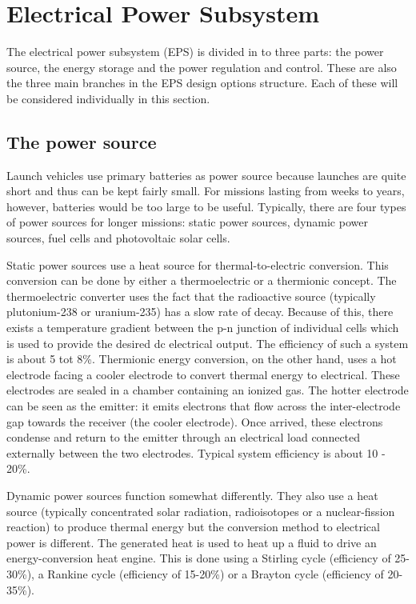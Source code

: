 \section{Electrical Power Subsystem}
\label{blDOEPS}

The electrical power subsystem (EPS) is divided in to three parts: the power source, the energy storage and the power regulation and control.
These are also the three main branches in the EPS design options structure. Each of these will be considered individually in this section.

\subsection{The power source}
\label{blDOPS}

Launch vehicles use primary batteries as power source because launches are quite short and thus can be kept fairly small. 
For missions lasting from weeks to years, however, batteries would be too large to be useful.
Typically, there are four types of power sources for longer missions: static power sources, dynamic power sources, fuel cells and photovoltaic solar cells.

Static power sources use a heat source for thermal-to-electric conversion. This conversion can be done by either a thermoelectric or a thermionic
concept. The thermoelectric converter uses the fact that the radioactive source (typically plutonium-238 or uranium-235) has a slow rate of decay.
Because of this, there exists a temperature gradient between the p-n junction of individual cells which is used to provide the desired dc electrical output. The efficiency of such a system is about 5 tot 8\%.
Thermionic energy conversion, on the other hand, uses a hot electrode facing a cooler electrode to convert thermal energy to electrical.
These electrodes are sealed in a chamber containing an ionized gas. The hotter electrode can be seen as the emitter: it emits electrons that flow
across the inter-electrode gap towards the receiver (the cooler electrode). Once arrived, these electrons condense and return to the emitter through an electrical load connected externally between the two electrodes. Typical system efficiency is about 10 - 20\%.

Dynamic power sources function somewhat differently. They also use a heat source (typically concentrated solar radiation, radioisotopes or a nuclear-fission reaction) to produce thermal energy but the conversion method to electrical power is different. The generated heat is used to heat up a fluid to drive an energy-conversion heat engine. This is done using a Stirling cycle (efficiency of 25-30\%), a Rankine cycle (efficiency of 15-20\%) or a Brayton cycle (efficiency of 20-35\%).

